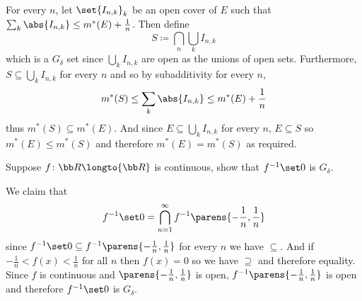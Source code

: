 \eexerc

For every $n$, let $\set{I_{n,k}}_k$ be an open cover of $E$ such that $\sum_k\abs{I_{n,k}}\leq m^*(E)+\frac1n$.
Then define
$$ S\coloneqq\bigcap_n\bigcup_k I_{n,k} $$
which is a $G_\delta$ set since $\bigcup_k I_{n,k}$ are open as the unions of open sets.
Furthermore, $S\subseteq\bigcup_k I_{n,k}$ for every $n$ and so by subadditivity for every $n$,
$$ m^*(S) \leq \sum_k\abs{I_{n,k}} \leq m^*(E) + \frac1n $$
thus $m^*(S)\subseteq m^*(E)$.
And since $E\subseteq\bigcup_k I_{n,k}$ for every $n$, $E\subseteq S$ so $m^*(E)\leq m^*(S)$ and therefore $m^*(E)=m^*(S)$ as required.

\bexerc

    Suppose $f\colon{\bb R}\longto{\bb R}$ is continuous, show that $f^{-1}\set0$ is $G_\delta$.

\eexerc

We claim that
$$ f^{-1}\set0 = \bigcap_{n=1}^\infty f^{-1}\parens{-\frac1n,\frac1n} $$
since $f^{-1}\set0\subseteq f^{-1}\parens{-\frac1n,\frac1n}$ for every $n$ we have $\subseteq$.
And if $-\frac1n<f(x)<\frac1n$ for all $n$ then $f(x)=0$ so we have $\supseteq$ and therefore equality.
Since $f$ is continuous and $\parens{-\frac1n,\frac1n}$ is open, $f^{-1}\parens{-\frac1n,\frac1n}$ is open and therefore $f^{-1}\set0$ is $G_\delta$.

\bye

